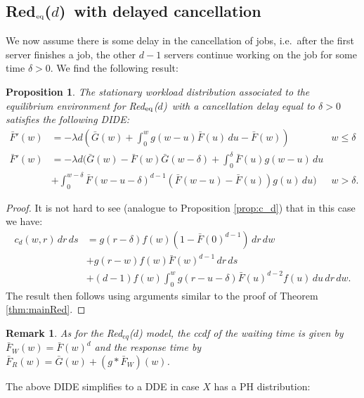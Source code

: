 \documentclass[12pt]{report}
\newcommand{\Redid}{Red$_{\textup{eq}}$($d$)}
\newtheorem{remark}{Remark}
\newtheorem{proposition}[theorem]{Proposition}
\begin{document}
\subsection{\Redid\ with delayed cancellation} \label{sec:delay}
We now assume there is some delay in the cancellation of jobs, i.e.~after the first server finishes a job, the other $d-1$ servers continue working on the job for some time $\delta > 0$. We find the following result:
\begin{proposition} \label{prop:delay}
The stationary workload distribution associated to the equilibrium environment for \Redid\ with a cancellation delay equal to $\delta > 0$ satisfies the following DIDE:
\begin{align}
\bar F'(w) &= -\lambda d \left( \bar G(w) + \int_0^w g(w-u) \bar F(u)\, du - \bar F(w) \right) & w \leq \delta \label{eq:delay1}\\
\bar F'(w) &= -\lambda d \bigg( \bar G(w) - \bar F(w) \bar G(w-\delta) + \int_0^{\delta} \bar F(u) g(w-u) \, du\nonumber& \nonumber \\
& + \int_0^{w-\delta} \bar F(w-u-\delta)^{d-1} (\bar F(w-u) -\bar F(u)) g(u) \, du \bigg) & w > \delta. \label{eq:delay2}
\end{align}
\end{proposition}
\begin{proof}
It is not hard to see (analogue to Proposition \ref{prop:c_d}) that in this case we have:
\begin{align*}
c_d(w,r) \, dr \, ds &= g(r-\delta) f(w) (1-\bar F(0)^{d-1}) \, dr \, dw\\
&+ g(r-w) f(w) \bar F(w)^{d-1} \, dr \, ds\\
&+(d-1) f(w) \int_0^w g(r-u-\delta) \bar F(u)^{d-2} f(u) \, du \, dr \, dw.
\end{align*}
The result then follows using  arguments similar to the proof of Theorem \ref{thm:mainRed}.
\end{proof}
\begin{remark}
As for the Red$_{eq}$($d$) model, the ccdf of the waiting time is given by $\bar F_W(w) = \bar F(w)^d$ and the response time by $\bar F_R(w) = \bar G(w) + (g * \bar F_W)(w)$.
\end{remark}
The above DIDE simplifies to a DDE in case $X$ has a PH distribution:
\end{document}
